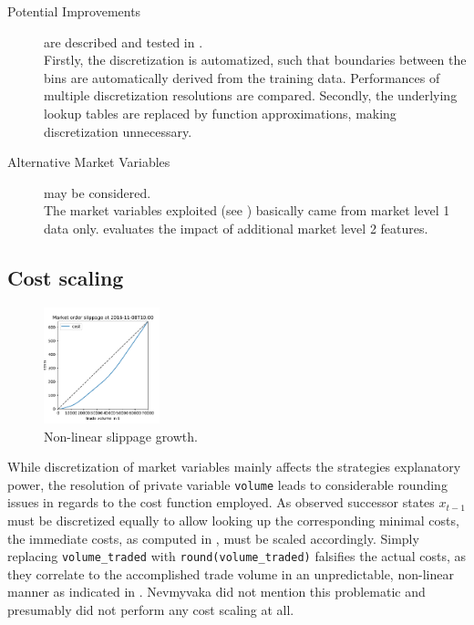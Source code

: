 \begin{description}
\item[Potential Improvements] are described and tested in .\\
Firstly, the discretization is automatized, such that boundaries between the bins are automatically derived from the training data. Performances of multiple discretization resolutions are compared. Secondly, the underlying lookup tables are replaced by function approximations, making discretization unnecessary.
\item[Alternative Market Variables] may be considered.\\
The market variables exploited (see ) basically came from market level 1 data only.  evaluates the impact of additional market level 2 features.
\end{description}



\subsection{Cost scaling}
\begin{figure}
	\centering
	\includegraphics[width=0.3\textwidth]{content/drawings/nonlinearcosts}
	\caption{Non-linear slippage growth.}
	\label{fig:nonlinearcosts}
\end{figure}
While discretization of market variables mainly affects the strategies explanatory power, the resolution of private variable \lstinline!volume! leads to considerable rounding issues in regards to the cost function employed. As observed successor states $x_{t-1}$ must be discretized equally to allow looking up the corresponding minimal costs, the immediate costs, as computed in , must be scaled accordingly. Simply replacing \lstinline!volume_traded! with \lstinline!round(volume_traded)! falsifies the actual costs, as they correlate to the accomplished trade volume in an  unpredictable, non-linear manner as indicated in . Nevmyvaka \etal \Cite{Nevmyvaka:2006} did not mention this problematic and presumably did not perform any cost scaling at all.

